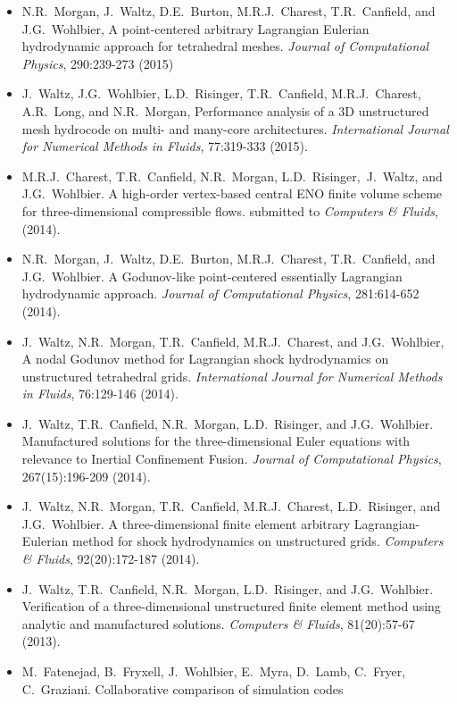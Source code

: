 \documentclass[12pt]{article}
\begin{document}
\begin{itemize}
\item N.R.~Morgan, J.~Waltz, D.E.~Burton, M.R.J.~Charest,
  T.R.~Canfield, and J.G.~Wohlbier, A point-centered arbitrary
  Lagrangian Eulerian hydrodynamic approach for tetrahedral meshes.
  {\it Journal of Computational Physics}, 290:239-273 (2015)
\item J.~Waltz, J.G.~Wohlbier, L.D.~Risinger, T.R.~Canfield,
  M.R.J.~Charest, A.R.~Long, and N.R.~Morgan, Performance analysis of
  a 3D unstructured mesh hydrocode on multi- and many-core
  architectures. {\it International Journal for Numerical Methods in
    Fluids}, 77:319-333 (2015).
\item M.R.J.~Charest, T.R.~Canfield, N.R.~Morgan,
  L.D.~Risinger,~J.~Waltz, and J.G.~Wohlbier. A high-order
  vertex-based central ENO finite volume scheme for three-dimensional
  compressible flows. submitted to {\it Computers \& Fluids}, (2014).
\item N.R.~Morgan, J.~Waltz, D.E.~Burton, M.R.J.~Charest,
  T.R.~Canfield, and J.G.~Wohlbier. A Godunov-like point-centered
  essentially Lagrangian hydrodynamic approach. {\it Journal of
    Computational Physics}, 281:614-652 (2014).
\item J.~Waltz, N.R.~Morgan, T.R.~Canfield, M.R.J.~Charest, and
  J.G.~Wohlbier, A nodal Godunov method for Lagrangian shock
  hydrodynamics on unstructured tetrahedral grids.
  {\it International Journal for Numerical Methods in Fluids},
  76:129-146 (2014).
\item J.~Waltz, T.R.~Canfield, N.R.~Morgan, L.D.~Risinger, and
  J.G.~Wohlbier. Manufactured solutions for the three-dimensional
  Euler equations with relevance to Inertial Confinement Fusion.
  {\it Journal of Computational Physics}, 267(15):196-209 (2014).
\item J.~Waltz, N.R.~Morgan, T.R.~Canfield, M.R.J.~Charest,
  L.D.~Risinger, and J.G.~Wohlbier. A three-dimensional finite
  element arbitrary Lagrangian-Eulerian method for shock hydrodynamics
  on unstructured grids. {\it Computers \& Fluids}, 92(20):172-187
  (2014).
\item J.~Waltz, T.R.~Canfield, N.R.~Morgan, L.D.~Risinger, and
  J.G.~Wohlbier. Verification of a three-dimensional unstructured
  finite element method using analytic and manufactured solutions.
  {\it Computers \& Fluids}, 81(20):57-67 (2013).
\item M.~Fatenejad, B.~Fryxell, J.~Wohlbier, E.~Myra, D.~Lamb,
  C.~Fryer, C.~Graziani. Collaborative comparison of simulation codes

\end{itemize}
\end{document}
